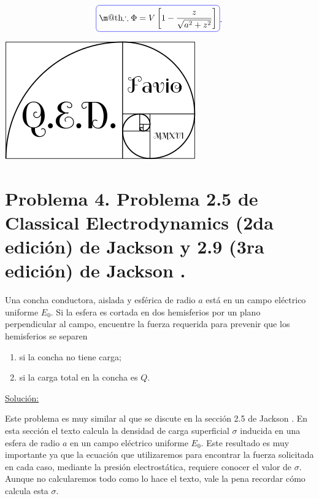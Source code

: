\documentclass[a4paper,11pt]{article}
\makeatletter
\numberwithin{equation}{section}
\newcommand*{\boxcolor}{blue}
\renewcommand{\boxed}[1]{\textcolor{\boxcolor}{%
\tikz[baseline={([yshift=-1ex]current bounding box.center)}] \node [rectangle, minimum width=1ex,rounded corners,draw] {\normalcolor\m@th$\displaystyle#1$};}}
\makeatother
\begin{document}
\begin{equation}
 \boxed{\therefore \Phi = V \left[1 - \frac{z}{\sqrt{a^2 + z^2}} \right]}.
\end{equation}

\hspace{10cm}\includegraphics[scale=0.2]{logoQED}

\newpage

\section{Problema 4. Problema 2.5 de Classical Electrodynamics (2da edición) de Jackson 
\cite{jackson2} y 2.9 (3ra edición) de Jackson \cite{jackson3}.}

Una concha conductora, aislada y esférica de radio $a$ está en un campo eléctrico 
uniforme $E_0$. Si la esfera es cortada en dos hemisferios por un plano perpendicular 
al campo, encuentre la fuerza requerida para prevenir que los hemisferios se 
separen 

\begin{enumerate}[label=\textbf{(\alph*)}]
 \item si la concha no tiene carga;
 \item si la carga total en la concha es $Q$.
\end{enumerate}

\vspace{.3cm}

\underline{Solución:} \vspace{.3cm}

Este problema es muy similar al que se discute en la sección 2.5 de Jackson \cite{jackson3}. En 
esta sección el texto calcula la densidad de carga superficial $\sigma$ inducida en una esfera de radio 
$a$ en un campo eléctrico uniforme $E_0$. Este resultado es muy importante ya que 
la ecuación que utilizaremos para encontrar la fuerza solicitada en cada caso, 
mediante la presión electrostática, requiere conocer el valor de $\sigma$. Aunque 
no calcularemos todo como lo hace el texto, vale la pena recordar cómo calcula 
esta $\sigma$.
\end{document}
